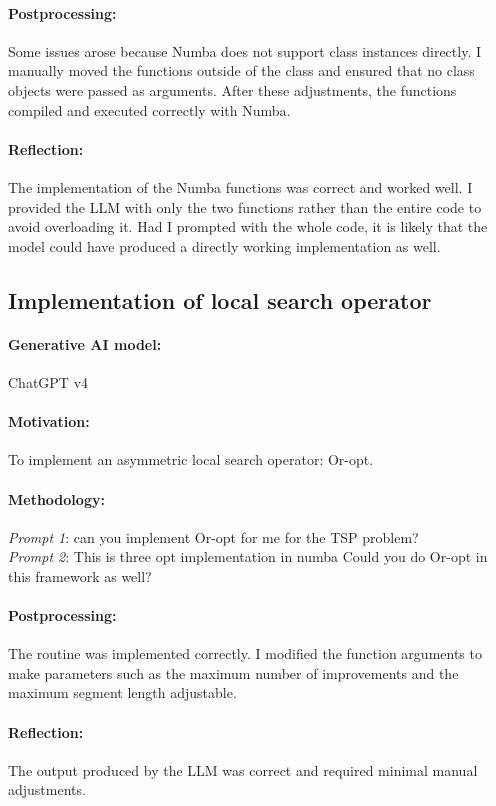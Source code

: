 \documentclass[a4paper,10pt]{article} %
\begin{document}
\paragraph{Postprocessing:} Some issues arose because Numba does not support class instances directly. I manually moved the functions outside of the class and ensured that no class objects were passed as arguments. After these adjustments, the functions compiled and executed correctly with Numba.

\paragraph{Reflection:} 
The implementation of the Numba functions was correct and worked well. I provided the LLM with only the two functions rather than the entire code to avoid overloading it. Had I prompted with the whole code, it is likely that the model could have produced a directly working implementation as well.

\subsection{Implementation of local search operator} 
\paragraph{Generative AI model:} ChatGPT v4
\paragraph{Motivation:}
To implement an asymmetric local search operator: Or-opt.

\paragraph{Methodology:} 
\textit{Prompt 1}: can you implement Or-opt for me for the TSP problem? \\
\textit{Prompt 2}:
This is three opt implementation in numba Could you do Or-opt in this framework as well?

\paragraph{Postprocessing:} The routine was implemented correctly. I modified the function arguments to make parameters such as the maximum number of improvements and the maximum segment length adjustable.
\paragraph{Reflection:} 
The output produced by the LLM was correct and required minimal manual adjustments.
\end{document}
